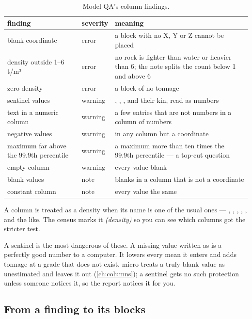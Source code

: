 \begin{table}[htbp]\small
\begin{tabularx}{\linewidth}{@{}llL@{}}\toprule
finding & severity & meaning \\ \midrule
blank coordinate & error & a block with no X, Y or Z cannot be placed \\
density outside 1–6 t/m³ & error & no rock is lighter than water or heavier than 6; the note splits the count below 1 and above 6 \\
zero density & error & a block of no tonnage \\
sentinel values & warning & , , ,  and their kin, read as numbers \\
text in a numeric column & warning & a few entries that are not numbers in a column of numbers \\
negative values & warning & in any column but a coordinate \\
maximum far above the 99.9th percentile & warning & a maximum more than ten times the 99.9th percentile — a top-cut question \\
empty column & warning & every value blank \\
blank values & note & blanks in a column that is not a coordinate \\
constant column & note & every value the same \\ \bottomrule
\end{tabularx}
\caption{Model QA's column findings.}\label{tab:qa-model}
\end{table}

A column is treated as a density when its name is one of the usual ones — , , , , ,  and the like. The census marks it \emph{(density)} so you can see which columns got the stricter test.

\begin{why}
A sentinel is the most dangerous of these. A missing value written as  is a perfectly good number to a computer. It lowers every mean it enters and adds tonnage at a grade that does not exist. micro treats a truly blank value as unestimated and leaves it out (\cref{ch:columns}); a sentinel gets no such protection unless someone notices it, so the report notices it for you.
\end{why}

\subsection{From a finding to its blocks}

